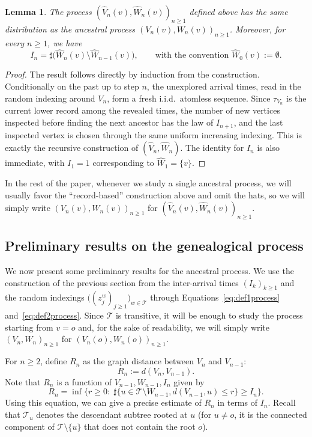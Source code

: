 \documentclass[french]{article}
\newcommand{\zi}{z}
\newtheorem{lemma}[theorem]{Lemma}
\newcommand{\T}{\mathcal{T}}
\renewcommand{\1}{\mathds{1}}
\begin{document}
\begin{lemma}\label{lemm:const_record} The process $(\hat{V}_n(v), \hat{W}_n(v))_{n \ge 1}$ defined above has the same distribution as the ancestral process $(V_n(v), W_n(v))_{n \ge 1}$. Moreover, for every $n\ge 1$, we have
\[
I_n = \sharp\bigl(\hat{W}_n(v) \setminus \hat{W}_{n-1}(v)\bigr),
\qquad \text{with the convention } \hat{W}_0(v) := \emptyset.
\]
\end{lemma}
\begin{proof}
The result follows directly by induction from the construction. Conditionally on the past up to step $n$, the unexplored arrival times, read in the random indexing around $V_n$, form a fresh i.i.d.\ atomless sequence. Since $\tau_{V_n}$ is the current lower record among the revealed times, the number of new vertices inspected before finding the next ancestor has the law of $I_{n+1}$, and the last inspected vertex is chosen through the same uniform increasing indexing. This is exactly the recursive construction of $(\hat{V}_n,\hat{W}_n)$. The identity for $I_n$ is also immediate, with $I_1=1$ corresponding to $\hat{W}_1=\{v\}$.
\end{proof}

In the rest of the paper, whenever we study a single ancestral process, we will usually favor the ``record-based'' construction above and omit the hats, so we will simply write $(V_n(v), W_n(v))_{n \ge 1}$ for $(\hat{V}_n(v), \hat{W}_n(v))_{n \ge 1}$.





\subsection{Preliminary results on the genealogical process}\label{sec:preliminaires}

We now present some preliminary results for the ancestral process. We use the construction of the previous section from the inter-arrival times $(I_k)_{k \ge 1}$ and the random indexings $\bigl((\zi_j^w)_{j \geq 1}\bigr)_{w \in \T}$ through Equations~\eqref{eq:def1process} and~\eqref{eq:def2process}. Since $\T$ is transitive, it will be enough to study the process starting from $v = o$ and, for the sake of readability, we will simply write $(V_n, W_n)_{n \ge 1}$ for $(V_n(o), W_n(o))_{n \ge 1}$. 


\medskip 

For $n\ge 2$, define $R_n$ as the graph distance between $V_n$ and $V_{n-1}$:
\begin{equation}\label{eq:defR_n}
    R_n:=d(V_n,V_{n-1}).
\end{equation}
Note that $R_n$ is a function of $V_{n-1},W_{n-1},I_n$ given by
\begin{equation}\label{eq:defR_n2}
R_n = \inf \{ r\ge 0:\; \sharp \{ u\in \T\setminus W_{n-1}, d(V_{n-1},u)\le r \} \geq I_n \}.
\end{equation}
Using this equation, we can give a precise estimate of $R_n$ in terms of $I_n$. Recall that $\T_u$ denotes the descendant subtree rooted at $u$ (for $u\neq o$, it is the connected component of $\T\setminus \{u\}$ that does not contain the root $o$).
\end{document}
